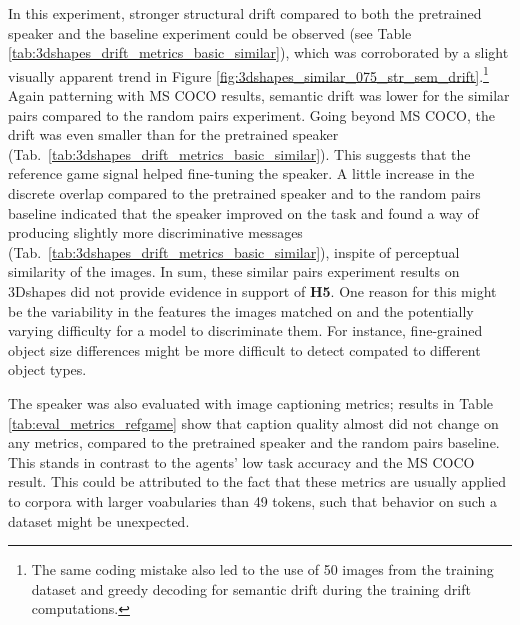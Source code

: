 In this experiment, stronger structural drift compared to both the pretrained speaker and the baseline experiment could be observed (see Table \ref{tab:3dshapes_drift_metrics_basic_similar}), which was corroborated by a slight visually apparent trend in Figure \ref{fig:3dshapes_similar_075_str_sem_drift}.\footnote{The same coding mistake also led to the use of 50 images from the training dataset and greedy decoding for semantic drift during the training drift computations.} Again patterning with MS COCO results, semantic drift was lower for the similar pairs compared to the random pairs experiment. Going beyond MS COCO, the drift was even smaller than for the pretrained speaker (Tab.~\ref{tab:3dshapes_drift_metrics_basic_similar}). This suggests that the reference game signal helped fine-tuning the speaker.
A little increase in the discrete overlap compared to the pretrained speaker and to the random pairs baseline indicated that the speaker improved on the task and found a way of producing slightly more discriminative messages (Tab.~\ref{tab:3dshapes_drift_metrics_basic_similar}), inspite of perceptual similarity of the images. In sum, these similar pairs experiment results on 3Dshapes did not provide evidence in support of \textbf{H5}. One reason for this might be the variability in the features the images matched on and the potentially varying difficulty for a model to discriminate them. For instance, fine-grained object size differences might be more difficult to detect compated to different object types.

The speaker was also evaluated with image captioning metrics; results in Table \ref{tab:eval_metrics_refgame} show that caption quality almost did not change on any metrics, compared to the pretrained speaker and the random pairs baseline. This stands in contrast to the agents' low task accuracy and the MS COCO result. This could be attributed to the fact that these metrics are usually applied to corpora with larger voabularies than 49 tokens, such that behavior on such a dataset might be unexpected.


